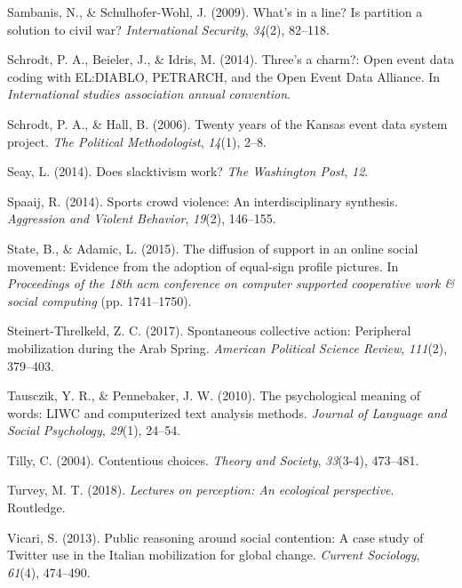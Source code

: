 \documentclass[
  english,
  man]{apa6}
\begin{document}
\leavevmode\hypertarget{ref-sambanis2009s}{}%
Sambanis, N., \& Schulhofer-Wohl, J. (2009). What's in a line? Is partition a solution to civil war? \emph{International Security}, \emph{34}(2), 82--118.

\leavevmode\hypertarget{ref-schrodt2014three}{}%
Schrodt, P. A., Beieler, J., \& Idris, M. (2014). Three's a charm?: Open event data coding with EL:DIABLO, PETRARCH, and the Open Event Data Alliance. In \emph{International studies association annual convention}.

\leavevmode\hypertarget{ref-schrodt2006twenty}{}%
Schrodt, P. A., \& Hall, B. (2006). Twenty years of the Kansas event data system project. \emph{The Political Methodologist}, \emph{14}(1), 2--8.

\leavevmode\hypertarget{ref-seay2014slacktivism}{}%
Seay, L. (2014). Does slacktivism work? \emph{The Washington Post}, \emph{12}.

\leavevmode\hypertarget{ref-spaaij2014sports}{}%
Spaaij, R. (2014). Sports crowd violence: An interdisciplinary synthesis. \emph{Aggression and Violent Behavior}, \emph{19}(2), 146--155.

\leavevmode\hypertarget{ref-state2015diffusion}{}%
State, B., \& Adamic, L. (2015). The diffusion of support in an online social movement: Evidence from the adoption of equal-sign profile pictures. In \emph{Proceedings of the 18th acm conference on computer supported cooperative work \& social computing} (pp. 1741--1750).

\leavevmode\hypertarget{ref-steinert2017spontaneous}{}%
Steinert-Threlkeld, Z. C. (2017). Spontaneous collective action: Peripheral mobilization during the Arab Spring. \emph{American Political Science Review}, \emph{111}(2), 379--403.

\leavevmode\hypertarget{ref-tausczik2010psychological}{}%
Tausczik, Y. R., \& Pennebaker, J. W. (2010). The psychological meaning of words: LIWC and computerized text analysis methods. \emph{Journal of Language and Social Psychology}, \emph{29}(1), 24--54.

\leavevmode\hypertarget{ref-tilly2004contentious}{}%
Tilly, C. (2004). Contentious choices. \emph{Theory and Society}, \emph{33}(3-4), 473--481.

\leavevmode\hypertarget{ref-turvey2018lectures}{}%
Turvey, M. T. (2018). \emph{Lectures on perception: An ecological perspective}. Routledge.

\leavevmode\hypertarget{ref-vicari2013public}{}%
Vicari, S. (2013). Public reasoning around social contention: A case study of Twitter use in the Italian mobilization for global change. \emph{Current Sociology}, \emph{61}(4), 474--490.
\end{document}
